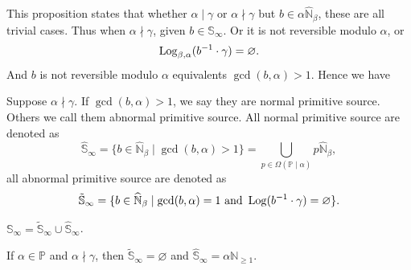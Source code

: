 This proposition states that whether $\alpha \mid \gamma$ or $\alpha \nmid \gamma$ but $b \in \alpha\widehat{\mathbb{N}}_\beta$, these are all trivial cases. Thus when $\alpha \nmid \gamma$, given $b \in \mathbb{S}_{\infty}$. Or it is not reversible modulo $\alpha$, or
\[\operatorname{Log}_{\beta, \alpha}(b^{-1} \cdot \gamma) = \varnothing. \]
And $b$ is not reversible modulo $\alpha$ equivalents $\gcd(b, \alpha) > 1$. Hence we have
\begin{definition}
    Suppose $\alpha \nmid \gamma$. If $\gcd(b, \alpha) > 1$, we say they are normal primitive source.
    Others we call them abnormal primitive source.
    All normal primitive source are denoted as 
    \[\hat{\mathbb{S}}_{\infty} = \{b \in \widehat{\mathbb{N}}_{\beta} \mid \gcd(b, \alpha) > 1\} = \bigcup_{p\in\Omega(\mathbb{P}\mid\alpha)} p\widehat{\mathbb{N}}_{{\beta}}, \]
    all abnormal primitive source are denoted as
    \[ \tilde{\mathbb{S}}_{\infty} = \{b \in \widehat{\mathbb{N}}_{\beta} \mid \gcd(b, \alpha) = 1 \text{ and } \operatorname{Log}(b^{-1}\cdot\gamma) = \varnothing\}. \]
\end{definition}
\begin{proposition}
    $\mathbb{S}_{\infty} = \tilde{\mathbb{S}}_{\infty} \cup \hat{\mathbb{S}}_{\infty}$.
\end{proposition}
\begin{proposition}\label{prop:primitive-source-of-simple-collatz-system}
    If $\alpha\in\mathbb{P}$ and $\alpha\nmid\gamma$, then $\tilde{\mathbb{S}}_{\infty} = \varnothing$ and $\hat{\mathbb{S}}_{\infty} = \alpha\mathbb{N}_{\ge 1}$.
\end{proposition}
